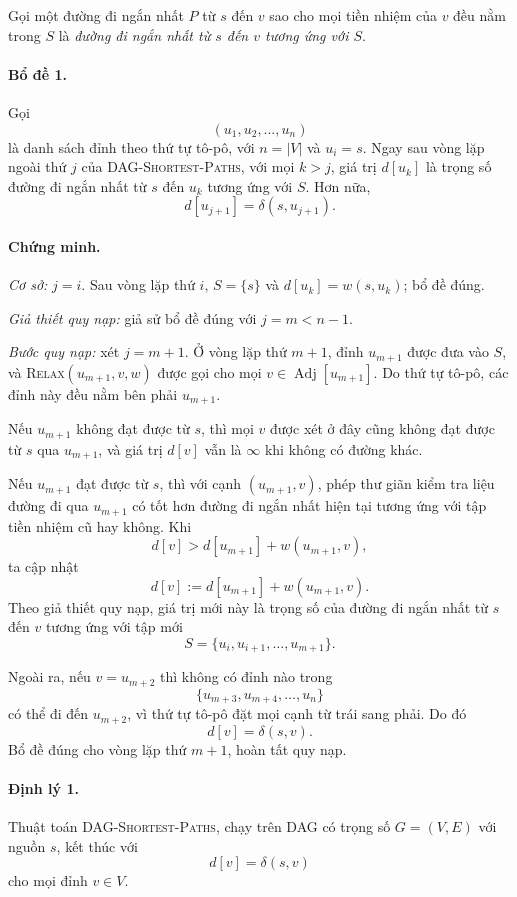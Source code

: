 \documentclass[11pt]{article}
\begin{document}
Gọi một đường đi ngắn nhất $P$ từ $s$ đến $v$ sao cho mọi tiền nhiệm của $v$
đều nằm trong $S$ là \emph{đường đi ngắn nhất từ $s$ đến $v$ tương ứng với
$S$}.

\paragraph{Bổ đề 1.}
Gọi
\[
  (u_1,u_2,\ldots,u_n)
\]
là danh sách đỉnh theo thứ tự tô-pô, với $n=|V|$ và $u_i=s$. Ngay sau vòng
lặp ngoài thứ $j$ của \textsc{DAG-Shortest-Paths}, với mọi $k>j$, giá trị
$d[u_k]$ là trọng số đường đi ngắn nhất từ $s$ đến $u_k$ tương ứng với $S$.
Hơn nữa,
\[
  d[u_{j+1}]=\delta(s,u_{j+1}).
\]

\paragraph{Chứng minh.}
\emph{Cơ sở:} $j=i$. Sau vòng lặp thứ $i$, $S=\{s\}$ và
$d[u_k]=w(s,u_k)$; bổ đề đúng.

\emph{Giả thiết quy nạp:} giả sử bổ đề đúng với $j=m<n-1$.

\emph{Bước quy nạp:} xét $j=m+1$. Ở vòng lặp thứ $m+1$, đỉnh $u_{m+1}$ được
đưa vào $S$, và \textsc{Relax}$(u_{m+1},v,w)$ được gọi cho mọi
$v\in\operatorname{Adj}[u_{m+1}]$. Do thứ tự tô-pô, các đỉnh này đều nằm bên
phải $u_{m+1}$.

Nếu $u_{m+1}$ không đạt được từ $s$, thì mọi $v$ được xét ở đây cũng không
đạt được từ $s$ qua $u_{m+1}$, và giá trị $d[v]$ vẫn là $\infty$ khi không có
đường khác.

Nếu $u_{m+1}$ đạt được từ $s$, thì với cạnh $(u_{m+1},v)$, phép thư giãn kiểm
tra liệu đường đi qua $u_{m+1}$ có tốt hơn đường đi ngắn nhất hiện tại tương
ứng với tập tiền nhiệm cũ hay không. Khi
\[
  d[v]>d[u_{m+1}]+w(u_{m+1},v),
\]
ta cập nhật
\[
  d[v]:=d[u_{m+1}]+w(u_{m+1},v).
\]
Theo giả thiết quy nạp, giá trị mới này là trọng số của đường đi ngắn nhất từ
$s$ đến $v$ tương ứng với tập mới
\[
  S=\{u_i,u_{i+1},\ldots,u_{m+1}\}.
\]

Ngoài ra, nếu $v=u_{m+2}$ thì không có đỉnh nào trong
\[
  \{u_{m+3},u_{m+4},\ldots,u_n\}
\]
có thể đi đến $u_{m+2}$, vì thứ tự tô-pô đặt mọi cạnh từ trái sang phải. Do
đó
\[
  d[v]=\delta(s,v).
\]
Bổ đề đúng cho vòng lặp thứ $m+1$, hoàn tất quy nạp.

\paragraph{Định lý 1.}
Thuật toán \textsc{DAG-Shortest-Paths}, chạy trên DAG có trọng số
$G=(V,E)$ với nguồn $s$, kết thúc với
\[
  d[v]=\delta(s,v)
\]
cho mọi đỉnh $v\in V$.
\end{document}
